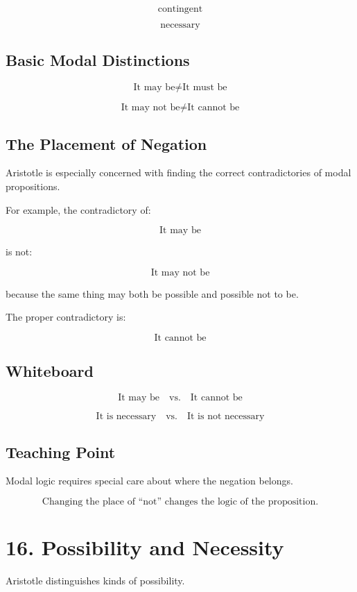 \documentclass[12pt]{article}
\begin{document}
\[
\text{contingent}
\]

\[
\text{necessary}
\]

\subsection*{Basic Modal Distinctions}

\[
\text{It may be} \neq \text{It must be}
\]

\[
\text{It may not be} \neq \text{It cannot be}
\]

\subsection*{The Placement of Negation}

Aristotle is especially concerned with finding the correct contradictories of
modal propositions.

For example, the contradictory of:

\[
\text{It may be}
\]

is not:

\[
\text{It may not be}
\]

because the same thing may both be possible and possible not to be.

The proper contradictory is:

\[
\text{It cannot be}
\]

\subsection*{Whiteboard}

\[
\text{It may be} \quad \text{vs.} \quad \text{It cannot be}
\]

\[
\text{It is necessary} \quad \text{vs.} \quad \text{It is not necessary}
\]

\subsection*{Teaching Point}

Modal logic requires special care about where the negation belongs.

\[
\boxed{
\text{Changing the place of ``not'' changes the logic of the proposition.}
}
\]

\section*{16. Possibility and Necessity}

Aristotle distinguishes kinds of possibility.
\end{document}
